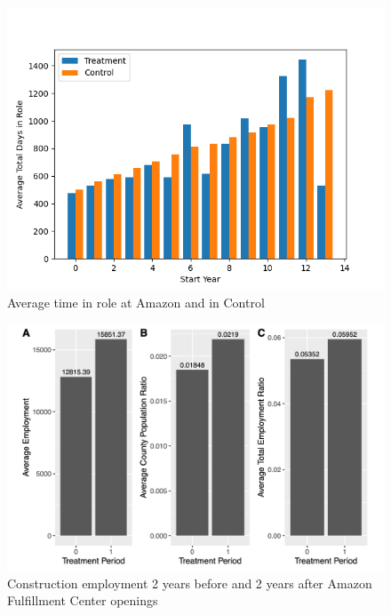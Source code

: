 \documentclass[11pt]{article}
\begin{document}
\begin{figure}
    \centering
    \includegraphics[width=13cm]{Time_in_role.png}
    \caption{Average time in role at Amazon and in Control}
\end{figure}

\begin{figure}[H]
\centering
\includegraphics[width=15cm]{CONSTR.png}
\caption{Construction employment 2 years before and 2 years after Amazon Fulfillment Center openings}
\end{figure}
\end{document}
